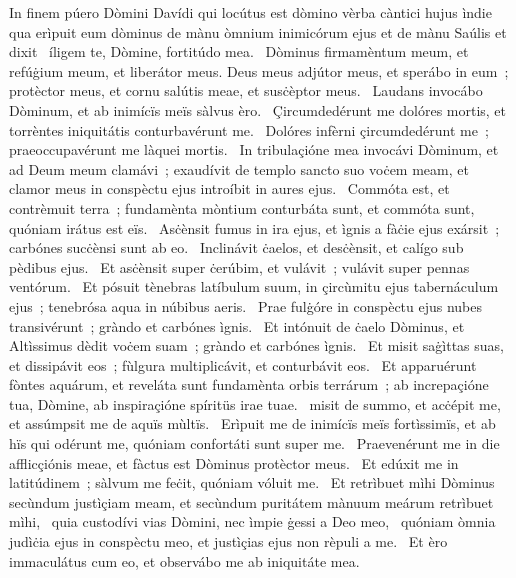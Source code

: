 { In finem púero Dòmini Davídi qui locútus est dòmino vèrba càntici hujus ìndie qua erìpuit eum dòminus de mànu òmnium inimicórum ejus et de mànu Saúlis et dixit}
{%
~íligem te, Dòmine, fortitúdo mea. 
~Dòminus firmamèntum meum, et refúġium meum, et liberátor meus. Deus meus adjútor meus, et sperábo in eum~; protèctor meus, et cornu salútis meae, et susċèptor meus. 
~Laudans invocábo Dòminum, et ab inimícïs meïs sàlvus èro. 
~Çircumdedérunt me dolóres mortis, et torrèntes iniquitátis conturbavérunt me. 
~Dolóres infèrni çircumdedérunt me~; praeoccupavérunt me làquei mortis. 
~In tribulaçióne mea invocávi Dòminum, et ad Deum meum clamávi~; exaudívit de templo sancto suo voċem meam, et clamor meus in conspèctu ejus introíbit in aures ejus. 
~Commóta est, et contrèmuit terra~; fundamènta mòntium conturbáta sunt, et commóta sunt, quóniam irátus est eïs. 
~Asċènsit fumus in ira ejus, et ìgnis a fàċie ejus exársit~; carbónes sucċènsi sunt ab eo. 
~Inclinávit ċaelos, et desċènsit, et calígo sub pèdibus ejus. 
~Et asċènsit super ċerúbim, et vulávit~; vulávit super pennas ventórum. 
~Et pósuit tènebras latíbulum suum, in çircùmitu ejus tabernáculum ejus~; tenebrósa aqua in núbibus aeris. 
~Prae fulġóre in conspèctu ejus nubes transivérunt~; gràndo et carbónes ìgnis. 
~Et intónuit de ċaelo Dòminus, et Altìssimus dèdit voċem suam~; gràndo et carbónes ìgnis. 
~Et misit saġìttas suas, et dissipávit eos~; fùlgura multiplicávit, et conturbávit eos. 
~Et apparuérunt fòntes aquárum, et reveláta sunt fundamènta orbis terrárum~; ab increpaçióne tua, Dòmine, ab inspiraçióne spíritüs irae tuae. 
~misit de summo, et acċépit me, et assúmpsit me de aquïs mùltïs. 
~Erìpuit me de inimícïs meïs fortìssimïs, et ab hïs qui odérunt me, quóniam confortáti sunt super me. 
~Praevenérunt me in die afflicçiónis meae, et fàctus est Dòminus protèctor meus. 
~Et edúxit me in latitúdinem~; sàlvum me feċit, quóniam vóluit me. 
~Et retrìbuet mìhi Dòminus secùndum justìçiam meam, et secùndum puritátem mànuum meárum retrìbuet mìhi, 
~quia custodívi vias Dòmini, nec ìmpie ġessi a Deo meo, 
~quóniam òmnia judìċia ejus in conspèctu meo, et justìçias ejus non rèpuli a me. 
~Et èro immaculátus cum eo, et observábo me ab iniquitáte mea. 
}
